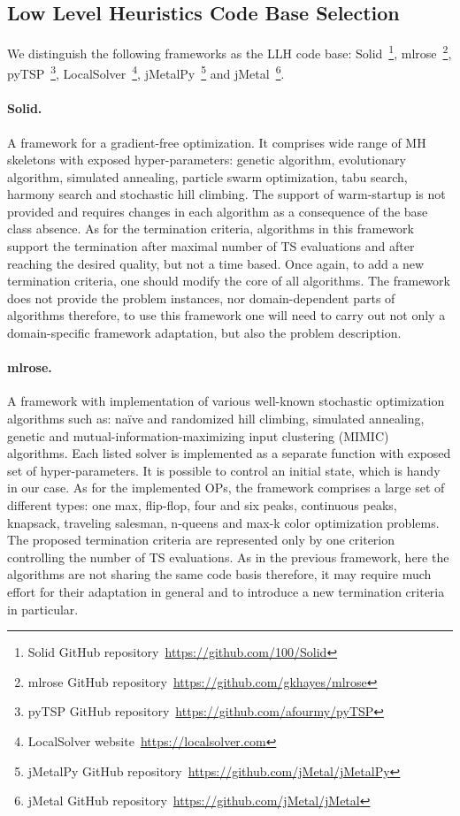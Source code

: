 \subsection{Low Level Heuristics Code Base Selection}\label{implementation:llh code basis selection}
We distinguish the following frameworks as the LLH code base: Solid~\footnote{Solid GitHub repository~\url{https://github.com/100/Solid}}, mlrose~\footnote{mlrose GitHub repository~\url{https://github.com/gkhayes/mlrose}}, pyTSP~\footnote{pyTSP GitHub repository~\url{https://github.com/afourmy/pyTSP}}, LocalSolver~\footnote{LocalSolver website~\url{https://localsolver.com}}, jMetalPy~\footnote{jMetalPy GitHub repository~\url{https://github.com/jMetal/jMetalPy}} and jMetal~\footnote{jMetal GitHub repository~\url{https://github.com/jMetal/jMetal}}.

\paragraph{Solid.} A framework for a gradient-free optimization. It comprises wide range of MH skeletons with exposed hyper-parameters: genetic algorithm, evolutionary algorithm, simulated annealing, particle swarm optimization, tabu search, harmony search and stochastic hill climbing. The support of warm-startup is not provided and requires changes in each algorithm as a consequence of the base class absence. As for the termination criteria, algorithms in this framework support the termination after maximal number of TS evaluations and after reaching the desired quality, but not a time based. Once again, to add a new termination criteria, one should modify the core of all algorithms. The framework does not provide the problem instances, nor domain-dependent parts of algorithms therefore, to use this framework one will need to carry out not only a domain-specific framework adaptation, but also the problem description.

\paragraph{mlrose.} A framework with implementation of various well-known stochastic optimization algorithms such as: na\"ive and randomized hill climbing, simulated annealing, genetic and mutual-information-maximizing input clustering (MIMIC) algorithms. Each listed solver is implemented as a separate function with exposed set of hyper-parameters. It is possible to control an initial state, which is handy in our case. As for the implemented OPs, the framework comprises a large set of different types: one max, flip-flop, four and six peaks, continuous peaks, knapsack, traveling salesman, n-queens and max-k color optimization problems. The proposed termination criteria are represented only by one criterion controlling the number of TS evaluations. As in the previous framework, here the algorithms are not sharing the same code basis therefore, it may require much effort for their adaptation in general and to introduce a new termination criteria in particular.

